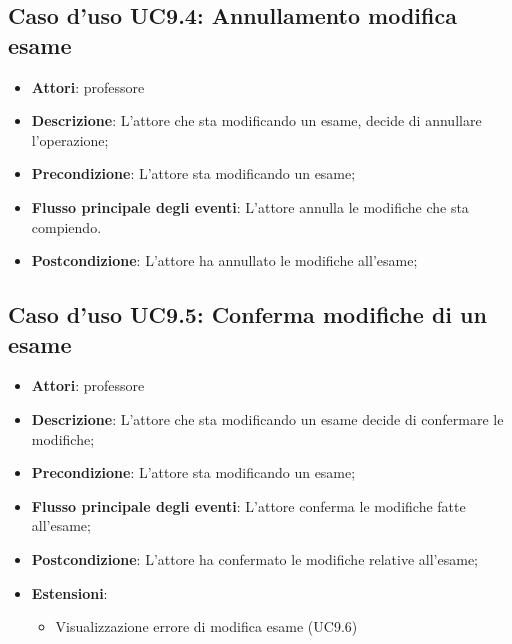 \subsection{Caso d'uso \texorpdfstring{UC9.4}{UC9.4}: Annullamento modifica esame}
\begin{itemize}
\item \textbf{Attori}: professore
\item \textbf{Descrizione}: L'attore che sta modificando un esame, decide di annullare l'operazione;
\item \textbf{Precondizione}: L'attore sta modificando un esame;
\item \textbf{Flusso principale degli eventi}: L'attore annulla le modifiche che sta compiendo.
\item \textbf{Postcondizione}: L'attore ha annullato le modifiche all'esame;
\end{itemize}
\subsection{Caso d'uso \texorpdfstring{UC9.5}{UC9.5}: Conferma modifiche di un esame}
\begin{itemize}
\item \textbf{Attori}: professore
\item \textbf{Descrizione}: L'attore che sta modificando un esame decide di confermare le modifiche;
\item \textbf{Precondizione}: L'attore sta modificando un esame;
\item \textbf{Flusso principale degli eventi}: L'attore conferma le modifiche fatte all'esame;
\item \textbf{Postcondizione}: L'attore ha confermato le modifiche relative all'esame;
\item \textbf{Estensioni}:
\begin{itemize}
\item Visualizzazione errore di modifica esame (UC9.6)
\end{itemize}
\end{itemize}
